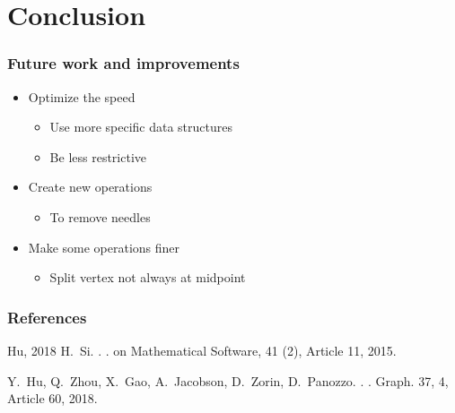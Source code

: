 \documentclass{beamer}
\begin{document}
\section{Conclusion}

\begin{frame}
	\frametitle{Future work and improvements}
	\begin{itemize}
		\item<1-> Optimize the speed
		      \begin{itemize}
			      \item<2-> Use more specific data structures
			      \item<2-> Be less restrictive
		      \end{itemize}
		\item<3-> Create new operations
		      \begin{itemize}
			      \item<4-> To remove needles
		      \end{itemize}
		\item<5-> Make some operations finer
		      \begin{itemize}
			      \item<6-> Split vertex not always at midpoint
		      \end{itemize}
	\end{itemize}
\end{frame}




\begin{frame}
	\frametitle{References}
	\begin{thebibliography}{Hu, 2018}
		H.~Si.
		.
		. on Mathematical Software, 41 (2), Article 11, 2015.

		Y.~Hu, Q.~Zhou, X.~Gao, A.~Jacobson, D.~Zorin, D.~Panozzo.
		.
		. Graph. 37, 4, Article 60, 2018.
	\end{thebibliography}
\end{frame}
\end{document}
